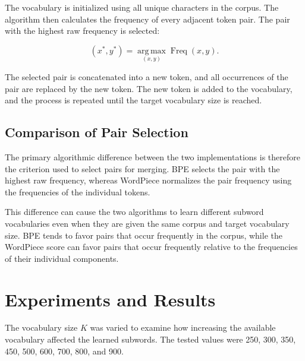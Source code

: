 \documentclass[sigconf]{acmart}
\begin{document}
The vocabulary is initialized using all unique characters in the
corpus. The algorithm then calculates the frequency of every adjacent
token pair. The pair with the highest raw frequency is selected:

\[
(x^*,y^*)
=
\underset{(x,y)}{\operatorname{arg\,max}}
\operatorname{Freq}(x,y).
\]

The selected pair is concatenated into a new token, and all occurrences
of the pair are replaced by the new token. The new token is added to
the vocabulary, and the process is repeated until the target vocabulary
size is reached.

\subsection{Comparison of Pair Selection}

The primary algorithmic difference between the two implementations is
therefore the criterion used to select pairs for merging. BPE selects
the pair with the highest raw frequency, whereas WordPiece normalizes
the pair frequency using the frequencies of the individual tokens.

This difference can cause the two algorithms to learn different
subword vocabularies even when they are given the same corpus and target
vocabulary size. BPE tends to favor pairs that occur frequently in the
corpus, while the WordPiece score can favor pairs that occur frequently
relative to the frequencies of their individual components.

\section{Experiments and Results}

The vocabulary size \(K\) was varied to examine how increasing the
available vocabulary affected the learned subwords. The tested values
were 250, 300, 350, 450, 500, 600, 700, 800, and 900.
\end{document}

